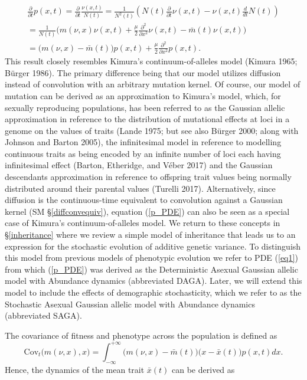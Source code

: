 \documentclass[]{article}
\begin{document}
\begin{multline}\label{p_PDE}
\frac{\partial}{\partial t}p(x,t)=\frac{\partial}{\partial t}\frac{\nu(x,t)}{N(t)}=\frac{1}{N^2(t)}\left(N(t)\frac{\partial}{\partial t}\nu(x,t)-\nu(x,t)\frac{d}{dt}N(t)\right) \\
=\frac{1}{N(t)}\Big(m(\nu,x)\nu(x,t)+\frac{\mu}{2}\frac{\partial^2}{\partial x^2}\nu(x,t)-\bar m(t)\nu(x,t)\Big) \\
=\Big(m(\nu,x)-\bar m(t)\Big) p(x,t)+\frac{\mu}{2}\frac{\partial^2}{\partial x^2}p(x,t).
\end{multline} This result closely resembles Kimura's
continuum-of-alleles model (Kimura 1965; Bürger 1986). The primary
difference being that our model utilizes diffusion instead of
convolution with an arbitrary mutation kernel. Of course, our model of
mutation can be derived as an approximation to Kimura's model, which,
for sexually reproducing populations, has been referred to as the
Gaussian allelic approximation in reference to the distribution of
mutational effects at loci in a genome on the values of traits (Lande
1975; but see also Bürger 2000; along with Johnson and Barton 2005), the
infinitesimal model in reference to modelling continuous traits as being
encoded by an infinite number of loci each having infinitesimal effect
(Barton, Etheridge, and Véber 2017) and the Gaussian descendants
approximation in reference to offspring trait values being normally
distributed around their parental values (Turelli 2017). Alternatively,
since diffusion is the continuous-time equivalent to convolution against
a Gaussian kernel (SM \S\ref{diffconvequiv}), equation (\ref{p_PDE}) can
also be seen as a special case of Kimura's continuum-of-alleles model.
We return to these concepts in \S\ref{inheritance} where we review a
simple model of inheritance that leads us to an expression for the
stochastic evolution of additive genetic variance. To distinguish this
model from previous models of phenotypic evolution we refer to PDE
(\ref{eq1}) from which (\ref{p_PDE}) was derived as the Deterministic
Asexual Gaussian allelic model with Abundance dynamics (abbreviated
DAGA). Later, we will extend this model to include the effects of
demographic stochasticity, which we refer to as the Stochastic Asexual
Gaussian allelic model with Abundance dynamics (abbreviated SAGA).

The covariance of fitness and phenotype across the population is defined
as \begin{equation}
\mathrm{Cov}_t\Big(m(\nu,x),x\Big)=\int_{-\infty}^{+\infty}\Big(m(\nu,x)-\bar m(t)\Big)\Big(x-\bar x(t)\Big)p(x,t)dx.
\end{equation} Hence, the dynamics of the mean trait \(\bar x(t)\) can
be derived as
\end{document}
